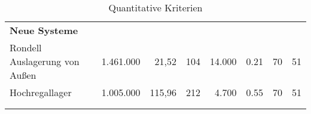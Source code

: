 \begin{landscape}
\begin{longtable}{p{}rrrrrrr}
    \midrule

    \textbf{Neue Systeme}                                                                                                                                                                                                                                                                                                          \\
    Rondell Auslagerung von Außen                      & \cite{ltw_kosten_konstruktionen} 1.461.000 & \cite{ltw_kosten_konstruktionen} 21,52     & \cite{ltw_kosten_konstruktionen} 104 & 14.000                     & 0.21                            & \cite{ltw_spielzeiten_20m_rondell} 70 & 51                                \\
    Hochregallager                                     & \cite{ltw_kosten_konstruktionen} 1.005.000 & \cite{ltw_kosten_konstruktionen} 115,96    & \cite{ltw_kosten_konstruktionen} 212 & 4.700                      & 0.55                            & \cite{ltw_spielzeiten_15m} 70         & 51                                \\

    \bottomrule

    \multicolumn{2}{c}{}                                                                                                                                                                                                                                                                                                           \\

    \caption{Quantitative Kriterien}
    \label{tab:quantitative_kriterien}
  \end{longtable}
\end{landscape}

\pagestyle{plain}

\restoregeometry